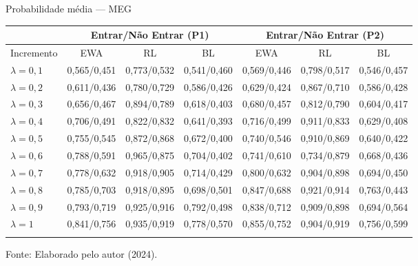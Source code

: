 \begin{tabela}[H]
	\small
	\centering
	\caption{Probabilidade média — MEG}
	\begin{tabular}{l|c c c|c c c}
		\Xhline{2\arrayrulewidth}
		& \multicolumn{3}{c|}{Entrar/Não Entrar (P1)} & \multicolumn{3}{c}{Entrar/Não Entrar (P2)} \\ 
		\hline
		Incremento & EWA & RL & BL & EWA & RL & BL \\ \hline
		$\lambda = 0,1$ & 0,565/0,451 & 0,773/0,532 & 0,541/0,460 & 0,569/0,446 & 0,798/0,517 & 0,546/0,457 \\
		$\lambda = 0,2$ & 0,611/0,436 & 0,780/0,729 & 0,586/0,426 & 0,629/0,424 & 0,867/0,710 & 0,586/0,428 \\
		$\lambda = 0,3$ & 0,656/0,467 & 0,894/0,789 & 0,618/0,403 & 0,680/0,457 & 0,812/0,790 & 0,604/0,417 \\
		$\lambda = 0,4$ & 0,706/0,491 & 0,822/0,832 & 0,641/0,393 & 0,716/0,499 & 0,911/0,833 & 0,629/0,408 \\
		$\lambda = 0,5$ & 0,755/0,545 & 0,872/0,868 & 0,672/0,400 & 0,740/0,546 & 0,910/0,869 & 0,640/0,422 \\
		$\lambda = 0,6$ & 0,788/0,591 & 0,965/0,875 & 0,704/0,402 & 0,741/0,610 & 0,734/0,879 & 0,668/0,436 \\
		$\lambda = 0,7$ & 0,778/0,632 & 0,918/0,905 & 0,714/0,429 & 0,800/0,632 & 0,904/0,898 & 0,694/0,450 \\
		$\lambda = 0,8$ & 0,785/0,703 & 0,918/0,895 & 0,698/0,501 & 0,847/0,688 & 0,921/0,914 & 0,763/0,443 \\
		$\lambda = 0,9$ & 0,793/0,719 & 0,925/0,916 & 0,792/0,498 & 0,838/0,712 & 0,909/0,898 & 0,694/0,564 \\
		$\lambda = 1$ & 0,841/0,756 & 0,935/0,919 & 0,778/0,570 & 0,855/0,752 & 0,904/0,919 & 0,756/0,599 \\
		\Xhline{2\arrayrulewidth}
	\end{tabular}
	\label{tabela_7}
	\caption*{\fontsize{10}{12}\selectfont Fonte: Elaborado pelo autor (2024).}
\end{tabela}
